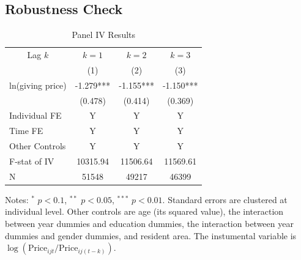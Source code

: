 \documentclass[ review  , 3p ]{elsarticle}
\begin{document}
  \hypertarget{robustness-check}{%
  \subsection{Robustness Check}\label{robustness-check}}

  \begin{table}

  \caption{\label{tab:kablePanelIVEstimateElasticity}Panel IV Results}
  \centering
  \begin{threeparttable}
  \begin{tabular}[t]{lccc}
  \toprule
  \multicolumn{1}{c}{Lag $k$} & \multicolumn{1}{c}{$k = 1$} & \multicolumn{1}{c}{$k = 2$} & \multicolumn{1}{c}{$k = 3$} \\
  \cmidrule(l{3pt}r{3pt}){1-1} \cmidrule(l{3pt}r{3pt}){2-2} \cmidrule(l{3pt}r{3pt}){3-3} \cmidrule(l{3pt}r{3pt}){4-4}
   & (1) & (2) & (3)\\
  \midrule
  ln(giving price) & -1.279*** & -1.155*** & -1.150***\\
   & (0.478) & (0.414) & (0.369)\\
  Individual FE & Y & Y & Y\\
  Time FE & Y & Y & Y\\
  Other Controls & Y & Y & Y\\
  F-stat of IV & 10315.94 & 11506.64 & 11569.61\\
  N & 51548 & 49217 & 46399\\
  \bottomrule
  \end{tabular}
  \begin{tablenotes}
  \item Notes: $^{*}$ $p < 0.1$, $^{**}$ $p < 0.05$, $^{***}$ $p < 0.01$. Standard errors are clustered at individual level. Other controls are age (its squared value), the interaction between year dummies and education dummies, the interaction between year dummies and gender dummies, and resident area. The instumental variable is $\log(\text{Price}_{ijt}/\text{Price}_{ij(t-k)})$.
  \end{tablenotes}
  \end{threeparttable}
  \end{table}
\end{document}
